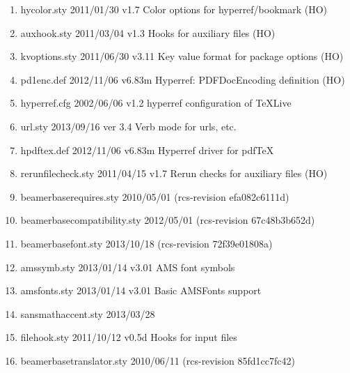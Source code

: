 \begin{enumerate}
\item 		 hycolor.sty 2011/01/30 v1.7 Color options for hyperref/bookmark (HO)
\item 		 auxhook.sty 2011/03/04 v1.3 Hooks for auxiliary files (HO)
\item 		 kvoptions.sty 2011/06/30 v3.11 Key value format for package options (HO)
\item 		 pd1enc.def 2012/11/06 v6.83m Hyperref: PDFDocEncoding definition (HO)
\item 		 hyperref.cfg 2002/06/06 v1.2 hyperref configuration of TeXLive
\item 		 url.sty 2013/09/16 ver 3.4 Verb mode for urls, etc.
\item 		 hpdftex.def 2012/11/06 v6.83m Hyperref driver for pdfTeX
\item 		 rerunfilecheck.sty 2011/04/15 v1.7 Rerun checks for auxiliary files (HO)
\item 		 beamerbaserequires.sty 2010/05/01 (rcs-revision efa082c6111d)
\item 		 beamerbasecompatibility.sty 2012/05/01 (rcs-revision 67c48b3b652d)
\item 		 beamerbasefont.sty 2013/10/18 (rcs-revision 72f39e01808a)
\item 		 amssymb.sty 2013/01/14 v3.01 AMS font symbols
\item 		 amsfonts.sty 2013/01/14 v3.01 Basic AMSFonts support
\item 		 sansmathaccent.sty 2013/03/28
\item 		 filehook.sty 2011/10/12 v0.5d Hooks for input files
\item 		 beamerbasetranslator.sty 2010/06/11 (rcs-revision 85fd1cc7fc42)

\end{enumerate}
